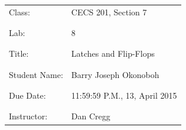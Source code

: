 \documentclass[9pt]{article}
\begin{document}
\vspace*{\fill}
\begin{center}
{\Huge \begin{tabular}{@{}ll@{}}
   Class: & CECS 201, Section 7 \\ \\ \\
   Lab: & 8 \\ \\ \\
   Title: & Latches and Flip-Flops \\ \\ \\
   Student Name: & Barry Joseph Okonoboh \\ \\ \\
   Due Date: & 11:59:59 P.M., 13, April 2015 \\ \\ \\
   Instructor: & Dan Cregg
\end{tabular}}
\end{center}
\vspace*{\fill}
\newpage
\end{document}
